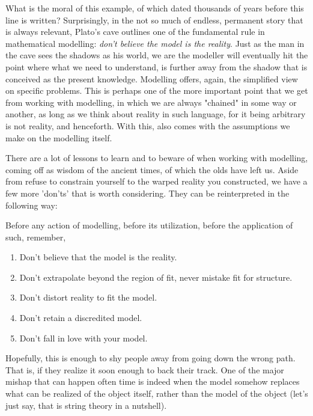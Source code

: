 What is the moral of this example, of which dated thousands of years before this line is written? Surprisingly, in the not so much of endless, permanent story that is always relevant, Plato's cave outlines one of the fundamental rule in mathematical modelling: \textit{don't believe the model is the reality}. Just as the man in the cave sees the shadows as his world, we are the modeller will eventually hit the point where what we need to understand, is further away from the shadow that is conceived as the present knowledge. Modelling offers, again, the simplified view on specific problems. This is perhaps one of the more important point that we get from working with modelling, in which we are always "chained" in some way or another, as long as we think about reality in such language, for it being arbitrary is not reality, and henceforth. With this, also comes with the assumptions we make on the modelling itself. 

There are a lot of lessons to learn and to beware of when working with modelling, coming off as wisdom of the ancient times, of which the olds have left us. Aside from refuse to constrain yourself to the warped reality you constructed, we have a few more 'don'ts' that is worth considering. They can be reinterpreted in the following way:
\begin{axiom}
    Before any action of modelling, before its utilization, before the application of such, remember,
    
    \begin{enumerate}[topsep=0pt,itemsep=1pt]
        \item Don't believe that the model is the reality. 
        \item Don't extrapolate beyond the region of fit, never mistake fit for structure. 
        \item Don't distort reality to fit the model. 
        \item Don't retain a discredited model. 
        \item Don't fall in love with your model. 
    \end{enumerate}
\end{axiom}
Hopefully, this is enough to shy people away from going down the wrong path. That is, if they realize it soon enough to back their track. One of the major mishap that can happen often time is indeed when the model somehow replaces what can be realized of the object itself, rather than the model of the object (let's just say, that is string theory in a nutshell). 

